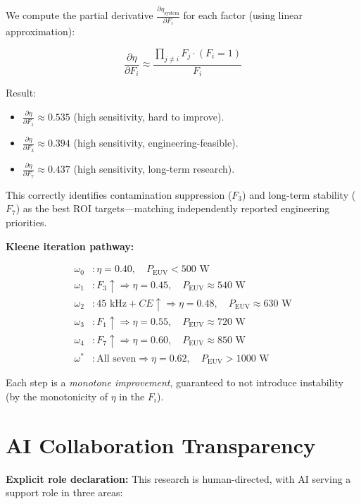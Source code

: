 \documentclass[twocolumn]{article}
\begin{document}
We compute the partial derivative $\frac{\partial \eta_{\text{system}}}{\partial F_i}$ for each factor (using linear approximation):

\[
\frac{\partial \eta}{\partial F_i} \approx \frac{\prod_{j \neq i} F_j \cdot (F_i = 1)}{F_i}
\]

Result:
\begin{itemize}
  \item $\frac{\partial \eta}{\partial F_1} \approx 0.535$ (high sensitivity, hard to improve).
  \item $\frac{\partial \eta}{\partial F_3} \approx 0.394$ (high sensitivity, engineering-feasible).
  \item $\frac{\partial \eta}{\partial F_7} \approx 0.437$ (high sensitivity, long-term research).
\end{itemize}

This correctly identifies contamination suppression ($F_3$) and long-term stability ($F_7$) as the best ROI targets—matching independently reported engineering priorities.

\textbf{Kleene iteration pathway:}

\begin{align}
\omega_0 &: \eta = 0.40, \quad P_{\text{EUV}} < 500\text{ W} \\
\omega_1 &: F_3 \uparrow \Rightarrow \eta = 0.45, \quad P_{\text{EUV}} \approx 540\text{ W} \\
\omega_2 &: 45\text{ kHz} + CE \uparrow \Rightarrow \eta = 0.48, \quad P_{\text{EUV}} \approx 630\text{ W} \\
\omega_3 &: F_1 \uparrow \Rightarrow \eta = 0.55, \quad P_{\text{EUV}} \approx 720\text{ W} \\
\omega_4 &: F_7 \uparrow \Rightarrow \eta = 0.60, \quad P_{\text{EUV}} \approx 850\text{ W} \\
\omega^* &: \text{All seven} \Rightarrow \eta = 0.62, \quad P_{\text{EUV}} > 1000\text{ W}
\end{align}

Each step is a \emph{monotone improvement}, guaranteed to not introduce instability (by the monotonicity of $\eta$ in the $F_i$).

\section{AI Collaboration Transparency}

\textbf{Explicit role declaration:} This research is human-directed, with AI serving a support role in three areas:
\end{document}
